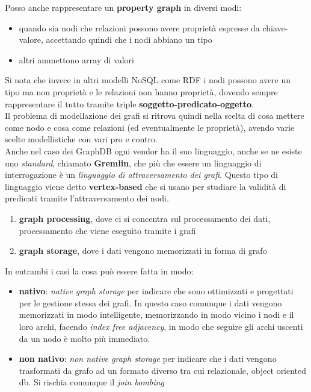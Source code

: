 Posso anche rappresentare un \textbf{property graph} in diversi modi:
\begin{itemize}
  \item quando sia nodi che relazioni possono avere proprietà espresse da chiave-valore, accettando quindi che i nodi abbiano un tipo
  \item altri ammettono array di valori
\end{itemize}
Si nota che invece in altri modelli NoSQL come RDF i nodi possono avere un tipo ma non proprietà e le relazioni non hanno proprietà, dovendo sempre rappresentare il tutto tramite triple \textbf{soggetto-predicato-oggetto}. \\
Il problema di modellazione dei grafi si ritrova quindi nella scelta di cosa mettere come nodo e cosa come relazioni (ed eventualmente le proprietà), avendo varie scelte modellistiche con vari pro e contro.\\ 
Anche nel caso dei GraphDB ogni vendor ha il suo linguaggio, anche se ne esiste uno \textit{standard}, chiamato \textbf{Gremlin}, che più che essere un linguaggio di interrogazione è un \textit{linguaggio di attraversamento dei grafi}. Questo tipo di linguaggio viene detto \textbf{vertex-based} che si usano per studiare la validità di predicati tramite l'attraversamento dei nodi.\\
\begin{enumerate}
  \item \textbf{graph processing}, dove ci si concentra sul processamento dei dati, processamento che viene eseguito tramite i grafi 
  \item \textbf{graph storage}, dove i dati vengono memorizzati in forma di grafo 
\end{enumerate}

In entrambi i casi la cosa può essere fatta in modo:
\begin{itemize}
  \item \textbf{nativo}:  \textit{native graph storage} per indicare che sono ottimizzati e progettati per le gestione stessa dei grafi. In questo caso comunque i dati vengono memorizzati in modo intelligente, memorizzando in modo vicino i nodi e il loro archi, facendo \textit{index free adjacency}, in modo che seguire gli archi uscenti da un nodo è molto più immediato.
  \item \textbf{non nativo}: \textit{non native graph storage} per indicare che i dati vengono trasformati da grafo ad un formato diverso tra cui relazionale, object oriented db. Si rischia comunque il \textit{join bombing}
\end{itemize}

